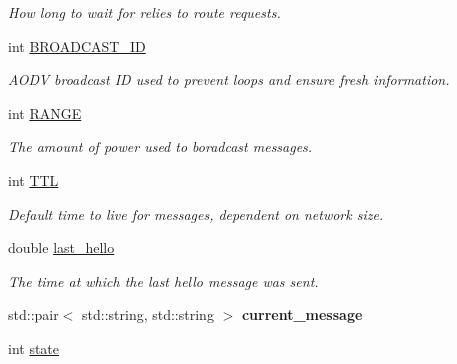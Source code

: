 \begin{DoxyCompactItemize}
\begin{DoxyCompactList}\small\item\em How long to wait for relies to route requests. \end{DoxyCompactList}\item 
int \hyperlink{class_aodv_ab93874fa41ef9af73418d214ccd466d2}{B\+R\+O\+A\+D\+C\+A\+S\+T\+\_\+\+ID}\hypertarget{class_aodv_ab93874fa41ef9af73418d214ccd466d2}{}\label{class_aodv_ab93874fa41ef9af73418d214ccd466d2}

\begin{DoxyCompactList}\small\item\em A\+O\+DV broadcast ID used to prevent loops and ensure fresh information. \end{DoxyCompactList}\item 
int \hyperlink{class_aodv_ac38532f60d01588244590f67a26ec444}{R\+A\+N\+GE}\hypertarget{class_aodv_ac38532f60d01588244590f67a26ec444}{}\label{class_aodv_ac38532f60d01588244590f67a26ec444}

\begin{DoxyCompactList}\small\item\em The amount of power used to boradcast messages. \end{DoxyCompactList}\item 
int \hyperlink{class_aodv_ae913ca4851a83972a6b2adcec001265a}{T\+TL}\hypertarget{class_aodv_ae913ca4851a83972a6b2adcec001265a}{}\label{class_aodv_ae913ca4851a83972a6b2adcec001265a}

\begin{DoxyCompactList}\small\item\em Default time to live for messages, dependent on network size. \end{DoxyCompactList}\item 
double \hyperlink{class_aodv_aad3ee31d3d30438ccfc4cd56f88e722c}{last\+\_\+hello}\hypertarget{class_aodv_aad3ee31d3d30438ccfc4cd56f88e722c}{}\label{class_aodv_aad3ee31d3d30438ccfc4cd56f88e722c}

\begin{DoxyCompactList}\small\item\em The time at which the last hello message was sent. \end{DoxyCompactList}\item 
std\+::pair$<$ std\+::string, std\+::string $>$ {\bfseries current\+\_\+message}\hypertarget{class_aodv_af150c2358b1a78383eb889533576c842}{}\label{class_aodv_af150c2358b1a78383eb889533576c842}

\item 
int \hyperlink{class_aodv_a2a4294d0e2a5deb2eb4638bfdf6acf05}{state}\hypertarget{class_aodv_a2a4294d0e2a5deb2eb4638bfdf6acf05}{}\label{class_aodv_a2a4294d0e2a5deb2eb4638bfdf6acf05}


\end{DoxyCompactItemize}
